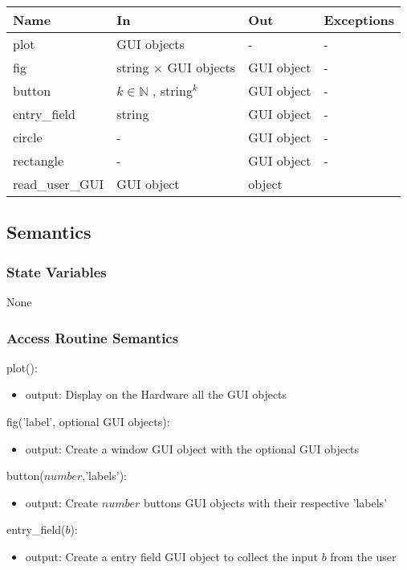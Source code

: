 \documentclass[12pt, titlepage]{article}
\begin{document}
\begin{center}
\begin{tabular}{p{3cm} p{4cm} p{4cm} p{2cm}}
\hline
\textbf{Name} & \textbf{In} & \textbf{Out} & \textbf{Exceptions} \\
\hline
plot & GUI objects & - & - \\
fig & string $\times$ GUI objects &  GUI object & - \\
button & $k \in \mathbb{N}$ , {string}$^{k}$ &  GUI object & - \\
entry{\_}field & string &  GUI object & - \\
circle & - &  GUI object & - \\
rectangle & - & GUI object & - \\
read{\_}user{\_}GUI & GUI object & object \\
\hline
\end{tabular}
\end{center}

\subsection{Semantics}

\subsubsection{State Variables}
None

\subsubsection{Access Routine Semantics}

\noindent plot():
\begin{itemize}
\item output: Display on the Hardware all the GUI objects 
\end{itemize}

\noindent fig('label', optional GUI objects):
\begin{itemize}
\item output: Create a window GUI object with the optional GUI objects
\end{itemize}

\noindent button($number$,'labels'):
\begin{itemize}
\item output: Create $number$ buttons GUI objects with their respective 'labels'
\end{itemize}

\noindent entry{\_}field($b$):
\begin{itemize}
\item output: Create a entry field GUI object to collect the input $b$ from the 
user
\end{itemize}
\end{document}
